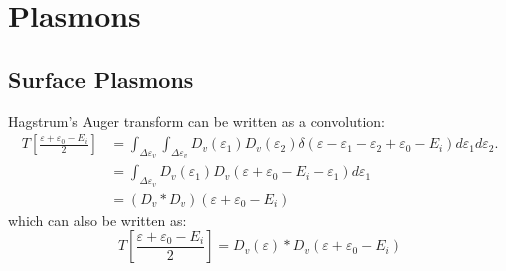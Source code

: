 \begin{refsection}
\begin{itemize}
\end{itemize}

\chapter{Plasmons} \label{sec:appendix-plasmon}

\section{Surface Plasmons}

Hagstrum's Auger transform can be written as a convolution:
\begin{equation}
\begin{aligned}
T\left[\frac{\varepsilon + \varepsilon_0 - E_i}{2}\right] &= \int_{\Delta\varepsilon_v}\int_{\Delta\varepsilon_v} D_v (\varepsilon_1) D_v (\varepsilon_2) \delta(\varepsilon - \varepsilon_1 - \varepsilon_2 + \varepsilon_0 - E_i) d\varepsilon_1 d\varepsilon_2. \\
&= \int_{\Delta\varepsilon_v} D_v (\varepsilon_1) D_v (\varepsilon + \varepsilon_0 - E_i - \varepsilon_1) d\varepsilon_1 \\ 
&= (D_v * D_v) (\varepsilon + \varepsilon_0 - E_i)
\end{aligned}
\end{equation}
which can also be written as:
\begin{equation}
T\left[\frac{\varepsilon + \varepsilon_0 - E_i}{2}\right] = D_v(\varepsilon) * D_v(\varepsilon + \varepsilon_0 - E_i)
\end{equation}


\end{refsection}
